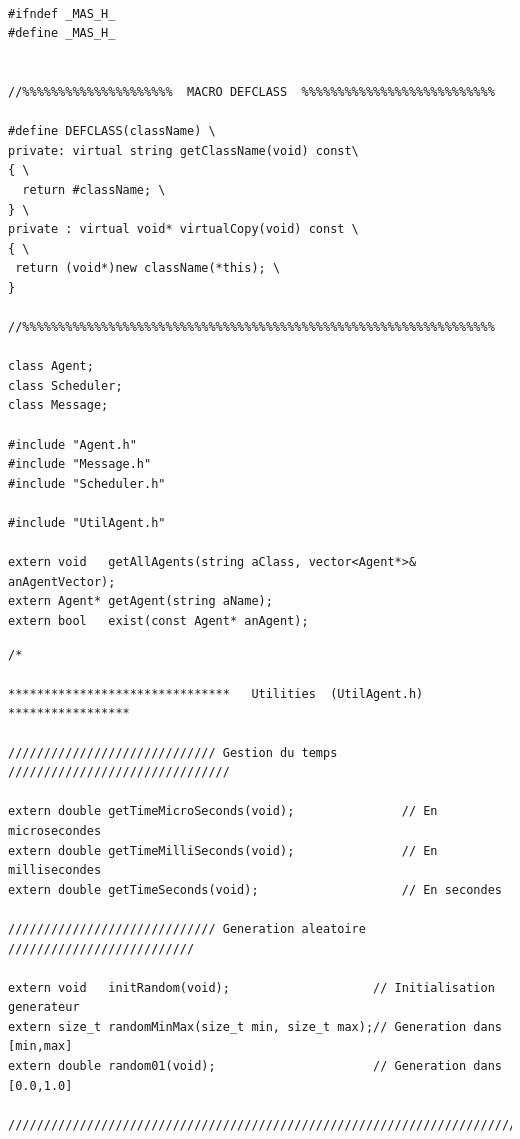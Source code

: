 \documentclass[12pt]{article}
\begin{document}
\begin{footnotesize}
\begin{verbatim}
                    
#ifndef _MAS_H_
#define _MAS_H_


//%%%%%%%%%%%%%%%%%%%%%  MACRO DEFCLASS  %%%%%%%%%%%%%%%%%%%%%%%%%%%

#define DEFCLASS(className) \
private: virtual string getClassName(void) const\
{ \
  return #className; \
} \
private : virtual void* virtualCopy(void) const \
{ \
 return (void*)new className(*this); \
}

//%%%%%%%%%%%%%%%%%%%%%%%%%%%%%%%%%%%%%%%%%%%%%%%%%%%%%%%%%%%%%%%%%%

class Agent;
class Scheduler;
class Message;

#include "Agent.h"
#include "Message.h"
#include "Scheduler.h"

#include "UtilAgent.h"

extern void   getAllAgents(string aClass, vector<Agent*>& anAgentVector);
extern Agent* getAgent(string aName);
extern bool   exist(const Agent* anAgent);

\end{verbatim}
\begin{verbatim}
/* 

*******************************   Utilities  (UtilAgent.h) *****************

///////////////////////////// Gestion du temps ///////////////////////////////

extern double getTimeMicroSeconds(void);               // En microsecondes
extern double getTimeMilliSeconds(void);               // En millisecondes
extern double getTimeSeconds(void);                    // En secondes

///////////////////////////// Generation aleatoire //////////////////////////

extern void   initRandom(void);                    // Initialisation generateur
extern size_t randomMinMax(size_t min, size_t max);// Generation dans [min,max]
extern double random01(void);                      // Generation dans [0.0,1.0]

/////////////////////////////////////////////////////////////////////////////


\end{verbatim}
\end{footnotesize}
\end{document}

